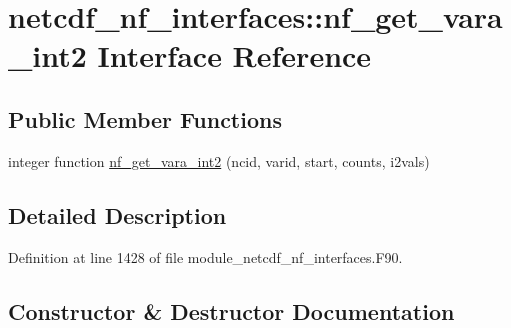 \hypertarget{interfacenetcdf__nf__interfaces_1_1nf__get__vara__int2}{}\section{netcdf\+\_\+nf\+\_\+interfaces\+:\+:nf\+\_\+get\+\_\+vara\+\_\+int2 Interface Reference}
\label{interfacenetcdf__nf__interfaces_1_1nf__get__vara__int2}
\subsection*{Public Member Functions}
\begin{DoxyCompactItemize}
\item 
integer function \hyperlink{interfacenetcdf__nf__interfaces_1_1nf__get__vara__int2_a59a13353724a077018f1ecc275af343e}{nf\+\_\+get\+\_\+vara\+\_\+int2} (ncid, varid, start, counts, i2vals)
\end{DoxyCompactItemize}


\subsection{Detailed Description}


Definition at line 1428 of file module\+\_\+netcdf\+\_\+nf\+\_\+interfaces.\+F90.



\subsection{Constructor \& Destructor Documentation}
\mbox{\label{interfacenetcdf__nf__interfaces_1_1nf__get__vara__int2_a59a13353724a077018f1ecc275af343e}} 
